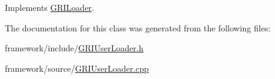 \-Implements \hyperlink{classGRILoader_a7f291c62743327222e6671b6bcb946e3}{\-G\-R\-I\-Loader}.



\-The documentation for this class was generated from the following files\-:\begin{DoxyCompactItemize}
\item 
framework/include/\hyperlink{GRIUserLoader_8h}{\-G\-R\-I\-User\-Loader.\-h}\item 
framework/source/\hyperlink{GRIUserLoader_8cpp}{\-G\-R\-I\-User\-Loader.\-cpp}\end{DoxyCompactItemize}
